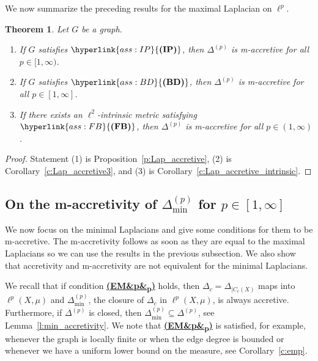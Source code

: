\documentclass[letterpaper]{article}
\newtheorem{theorem}[lemma]{Theorem}
\theoremstyle{definition}
\theoremstyle{named}
\numberwithin{equation}{section}
\newcommand{\IP}{\hyperlink{ass:IP}{\textup{\textbf{(IP)}}}}
\newcommand{\BD}{\hyperlink{ass:BD}{\textup{\textbf{(BD)}}}}
\newcommand{\FB}{\hyperlink{ass:FB}{\textup{\textbf{(FB)}}}}
\newcommand{\EM}[1][]{\hyperlink{ass:EM}{\textup{\textbf{(EM\ifx&#1&\else\textsubscript{#1}\fi)}}}}
\newcommand{\Dep}{\Delta^{(p)}}
\newcommand{\deltam}{\Delta_{\min}}
\begin{document}
We now summarize the preceding results for the maximal Laplacian on $\ell^p$.
\begin{theorem}\label{t:Lap_accretive}
Let $G$ be a graph.
\begin{enumerate}
\item[\textup{(1)}] If $G$ satisfies $\IP$, then $\Dep$ is m-accretive for all $p \in [1,\infty)$.
\item[\textup{(2)}] If $G$ satisfies $\BD$, then $\Dep$ is m-accretive for all $p \in [1,\infty]$. 
\item[\textup{(3)}] If there exists an $\ell^2$-intrinsic metric satisfying $\FB$, then
$\Dep$ is m-accretive for all $p \in (1,\infty)$.
\end{enumerate}
\end{theorem}
\begin{proof}
Statement (1) is Proposition~\ref{p:Lap_accretive}, (2) is Corollary~\ref{c:Lap_accretive3}, and
(3) is Corollary~\ref{c:Lap_accretive_intrinsic}. 
\end{proof}


\subsection{\texorpdfstring{On the m-accretivity of $\deltam^{(p)}$ for $p\in[1,\infty]$}{On the m-accretivity of Delta min p for p in [1,infty]}}
We now focus on the minimal Laplacians and give some conditions for them to be
m-accretive. The m-accretivity follows as soon as they are equal to the maximal Laplacians so
we can use the results in the previous subsection. We also show that accretivity
and m-accretivity are not equivalent for the minimal Laplacians.

We recall that if condition \EM[p] holds, then $\Delta_c=\Delta_{|C_c(X)}$ maps into $\ell^p(X, \mu)$
and $\Delta_{\min}^{(p)}$, the closure of $\Delta_c$ in $\ell^p(X,\mu)$,
is always accretive. Furthermore, if $\Delta^{(p)}$ is closed, then $\deltam^{(p)} \subseteq \Delta^{(p)}$, see Lemma~\ref{l:min_accretivity}.
We note that \EM[p]
is satisfied, for example, whenever the graph is locally finite or when the edge degree
is bounded or whenever we have a uniform lower bound
on the measure, see Corollary~\ref{c:emp}.
\end{document}
